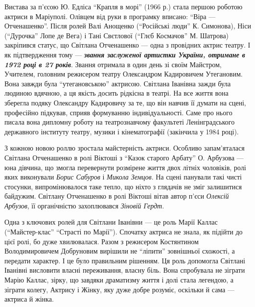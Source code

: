 Вистава за п'єсою Ю. Едліса \enquote{Крапля в морі} (1966 р.) стала першою роботою
актриси в Маріуполі. Олівцем від руки в програмку вписано: \enquote{Віра —
Отченашенко}. Після ролей Валі Анощенко (\enquote{Російські люди} К. Симонова), Ніси
(\enquote{Дурочка} Лопе де Вега) і Тані Свєтлової (\enquote{Глєб Космачов} М. Шатрова)
закріпився статус, що Світлана Отченашенко — одна з провідних актрис театру. І
як підтвердження тому — \emph{\textbf{звання заслуженої артистки України, отримане в 1972
році в 27 років}}. Звання отримала в один день зі своїм Майстром, Учителем,
головним режисером театру Олександром Кадировичем Утегановим. Вона завжди була
\enquote{утегановською} актрисою. Світлана Іванівна зажди була людиною вдячною, а ця
якість досить рідкісна в театрі. На все життя вона зберегла подяку Олександру
Кадировичу за те, що він навчив її думати на сцені, професійно підкував, сприяв
формуванню індивідуальності. Саме про нього писала вона дипломну роботу на
театрознавчому факультеті Ленінградського державного інституту театру, музики і
кінематографії (закінчила у 1984 році).


З кожною новою роллю зростала майстерність актриси. Особливо запам'яталася
Світлана Отченашенко в ролі Віктоші з \enquote{Казок старого Арбату} О. Арбузова — юна
дівчина, що змогла перевернути розмірене життя двох літніх чоловіків, ролі яких
виконували \emph{Борис Сабуров} і \emph{Микола Земцов}. На сцені панували такі чисті
стосунки, випромінювалося таке тепло, що ніхто з глядачів не зміг залишитися
байдужим. Світлану Отченашенко в ролі Віктоші вітав автор п'єси \emph{Олексій
Арбузов}, її органічністю захоплювався \emph{Зіновій Гердт}.


Одна з ключових ролей для Світлани Іванівни — це роль Марії Каллас
(\enquote{Майстер-клас} \enquote{Страсті по Марії}). Спочатку актриса не знала, як підійти до
цієї ролі, бо дуже хвилювалася. Разом з режисером Костянтином Володимировичем
Добруновим вирішили не \enquote{ліпити} зовнішньої схожості, а передати характер. І це
було правильним рішенням. Ця роль допомогла Світлані Іванівні висловити власні
переживання, власну біль. Вона спробувала не зіграти Марію Каллас, зірку, що
завдяки драматизму життя і долі стала легендою, а зіграти колегу, Актрису і
Жінку, яку дуже добре розуміє, оскільки й сама — актриса й жінка. 

